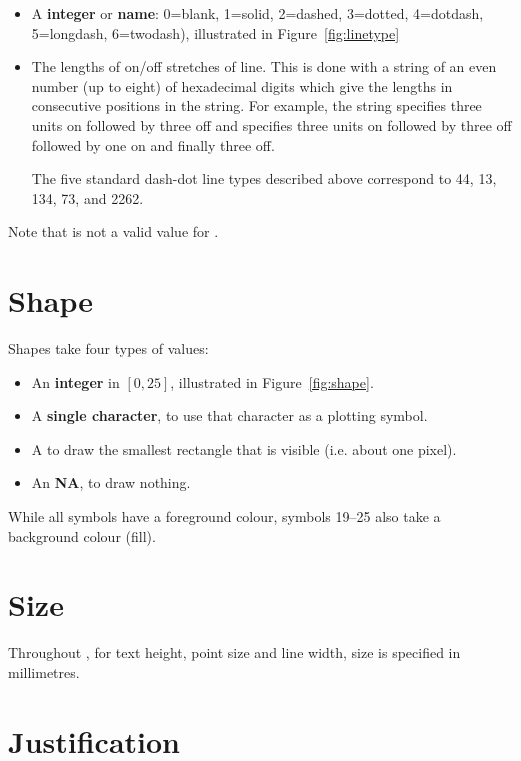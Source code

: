 \begin{itemize}
  \item A {\bf integer} or {\bf name}: 0=blank, 1=solid, 2=dashed, 3=dotted, 4=dotdash, 5=longdash, 6=twodash), illustrated in Figure~\ref{fig:linetype}

  \item The lengths of on/off stretches of line. This is done with a string of an even number (up to eight) of hexadecimal digits which give the lengths in consecutive positions in the string. For example, the string  specifies three units on followed by three off and  specifies three units on followed by three off followed by one on and finally three off. 
  
  The five standard dash-dot line types described above correspond to 44, 13, 134, 73, and 2262.
\end{itemize} 

Note that  is not a valid value for .

\section{Shape}
\label{sec:shape_spec}

Shapes take four types of values:

\begin{itemize}
  \item An {\bf integer} in $[0, 25]$, illustrated in Figure~\ref{fig:shape}.

  \item A {\bf single character}, to use that character as a plotting symbol. 

  \item A  to draw the smallest rectangle that is visible (i.e. about one pixel).
  
  \item An {\bf NA}, to draw nothing.
\end{itemize}

While all symbols have a foreground colour, symbols 19--25 also take a background colour (fill). 

\section{Size}
\label{sec:size}

Throughout \ggplot, for text height, point size and line width, size is specified in millimetres.

\section{Justification}
\label{sec:justification_spec}

